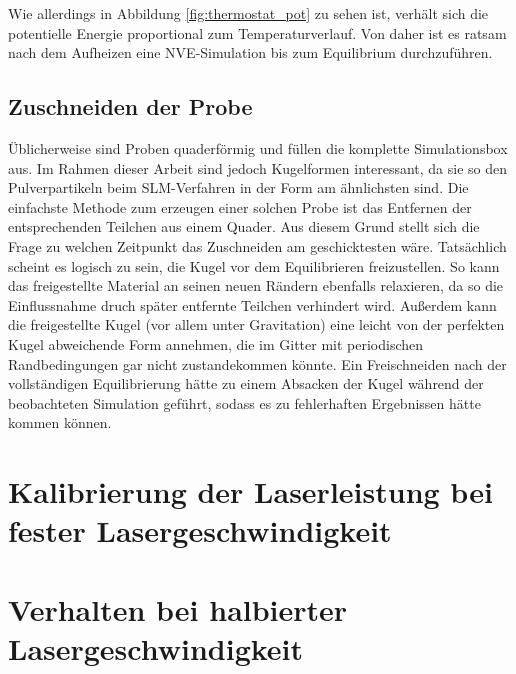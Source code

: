 		Wie allerdings in Abbildung \ref{fig:thermostat_pot} zu sehen ist, verhält sich die
		potentielle Energie proportional zum Temperaturverlauf. Von daher ist es ratsam nach dem
		Aufheizen eine NVE-Simulation bis zum Equilibrium durchzuführen.

	\subsection{Zuschneiden der Probe}
		Üblicherweise sind Proben quaderförmig und füllen die komplette Simulationsbox aus. Im
		Rahmen dieser Arbeit sind jedoch Kugelformen interessant, da sie so den Pulverpartikeln
		beim SLM-Verfahren in der Form am ähnlichsten sind. Die einfachste Methode zum erzeugen
		einer solchen Probe ist das Entfernen der entsprechenden Teilchen aus einem Quader. Aus
		diesem Grund stellt sich die Frage zu welchen Zeitpunkt das Zuschneiden am geschicktesten
		wäre. Tatsächlich scheint es logisch zu sein, die Kugel vor dem Equilibrieren
		freizustellen. So kann das freigestellte Material an seinen neuen Rändern ebenfalls
		relaxieren, da so die Einflussnahme druch später entfernte Teilchen verhindert wird.
		Außerdem kann die freigestellte Kugel (vor allem unter Gravitation) eine leicht von der
		perfekten Kugel abweichende Form annehmen, die im Gitter mit periodischen Randbedingungen
		gar nicht zustandekommen könnte. Ein Freischneiden nach der vollständigen Equilibrierung
		hätte zu einem Absacken der Kugel während der beobachteten Simulation geführt, sodass es
		zu fehlerhaften Ergebnissen hätte kommen können.


\section{Kalibrierung der Laserleistung bei fester Lasergeschwindigkeit}

\section{Verhalten bei halbierter Lasergeschwindigkeit}
